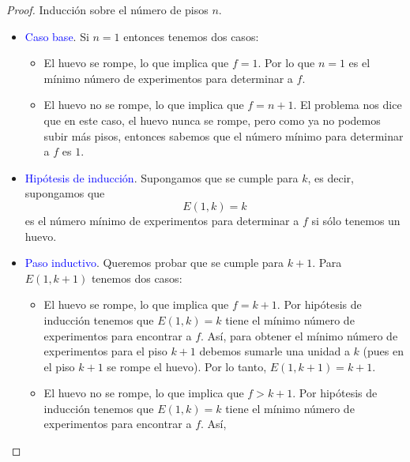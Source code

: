 \documentclass[letterpaper,11pt]{article}
\begin{document}
\begin{enumerate}
\begin{enumerate}
        \begin{proof}
            Inducción sobre el número de pisos $n$.
            \begin{itemize}
                \item \textcolor{blue}{Caso base}. Si $n = 1$ entonces 
                tenemos dos casos:
                \begin{itemize}
                    \item El huevo se rompe, lo que implica que $f=1$. Por lo 
                    que $n=1$ es el mínimo número de experimentos para determinar
                    a $f$.

                    \item El huevo no se rompe, lo que implica que $f=n+1$. El 
                    problema nos dice que en este caso, el huevo nunca se rompe, 
                    pero como ya no podemos subir más pisos, entonces sabemos 
                    que el número mínimo para determinar a $f$ es $1$.
                \end{itemize}
                
                \item \textcolor{blue}{Hipótesis de inducción}. Supongamos 
                que se cumple para $k$, es decir, supongamos que 
                \begin{equation*}
                    E(1, k) = k
                \end{equation*}
                es el número mínimo de experimentos para determinar a $f$ si 
                sólo tenemos un huevo.

                \item \textcolor{blue}{Paso inductivo}. Queremos probar que se 
                cumple para $k+1$. Para $E(1, k+1)$ tenemos dos casos:
                \begin{itemize}
                    \item El huevo se rompe, lo que implica que $f = k+1$. 
                    Por hipótesis de inducción tenemos que $E(1,k) = k$ tiene 
                    el mínimo número de experimentos para encontrar a $f$. 
                    Así, para obtener el mínimo número de experimentos para 
                    el piso $k+1$ debemos sumarle una unidad a $k$ (pues en el 
                    piso $k+1$ se rompe el huevo). Por lo tanto, 
                    $E(1,k+1) = k+1$.

                    \item El huevo no se rompe, lo que implica que $f > k+1$. 
                    Por hipótesis de inducción tenemos que $E(1,k) = k$ tiene 
                    el mínimo número de experimentos para encontrar a $f$. 
                    Así,  
                \end{itemize} 
            \end{itemize}


\end{proof}
\end{enumerate}
\end{enumerate}
\end{document}
